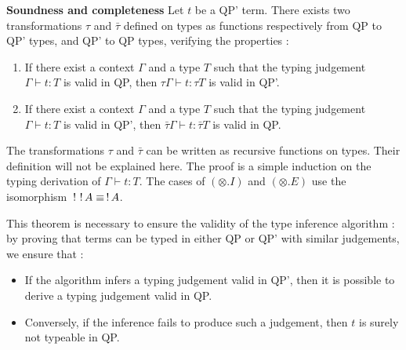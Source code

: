 \begin{thm}{\bf Soundness and completeness} Let $t$ be a QP' term. There exists two transformations $\tau$ and
	$\bar \tau$ defined on types as functions respectively from QP to QP' types, and QP' to QP types, verifying the properties :
	\begin{enumerate}
		\item If there exist a context $\Gamma$ and a type $T$ such that the typing judgement $\Gamma \vdash t : T$ is valid in QP, then
			$\tau\Gamma \vdash t : \tau T$ is valid in QP'.
		\item If there exist a context $\Gamma$ and a type $T$ such that the typing judgement $\Gamma \vdash t : T$ is valid in QP', then
			$\bar \tau \Gamma \vdash t : \bar \tau T$ is valid in QP.
	\end{enumerate}
	
	\begin{proofsketch}
		The transformations $\tau$ and $\bar \tau$ can be written as recursive functions on types. Their definition will not be explained
		here. The proof is a simple induction on the typing derivation of $\Gamma \vdash t : T$. The cases of $(\otimes.I)$ and
		$(\otimes.E)$ use the isomorphism $\,!\,\,!\, A \equiv \,!\, A$.
	\end{proofsketch}
\end{thm}

\begin{remark}
	This theorem is necessary to ensure the validity of the type inference algorithm : by proving that
	terms can be typed in either QP or QP' with similar judgements, we ensure that :
	\begin{itemize}
		\item If the algorithm infers a typing judgement valid in QP', then it is possible to derive a typing judgement valid in QP.
		\item Conversely, if the inference fails to produce such a judgement, then $t$ is surely not typeable in QP.
	\end{itemize}
\end{remark}

